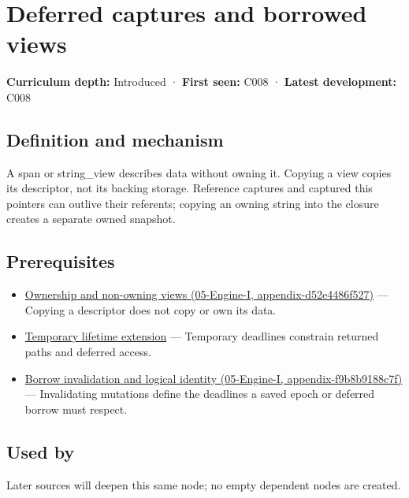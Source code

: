\hypertarget{appendix-aea529eb5175}{}
\section{Deferred captures and borrowed views}\label{appendix-aea529eb5175-deferred-captures-and-borrowed-views}

\textbf{Curriculum depth:} Introduced · \textbf{First seen:} C008 · \textbf{Latest development:} C008

\subsection{Definition and mechanism}\label{appendix-aea529eb5175-definition-and-mechanism}

A span or string\_view describes data without owning it. Copying a view copies its descriptor, not its backing storage. Reference captures and captured this pointers can outlive their referents; copying an owning string into the closure creates a separate owned snapshot.

\subsection{Prerequisites}\label{appendix-aea529eb5175-prerequisites}

\begin{itemize}
\tightlist
\item
  \href{../05-Engine-I/main.pdf\#nameddest=appendix-d52e4486f527}{Ownership and non-owning views (05-Engine-I, appendix-d52e4486f527)} --- Copying a descriptor does not copy or own its data.
\item
  \hyperref[appendix-a978b29bbbb0]{Temporary lifetime extension} --- Temporary deadlines constrain returned paths and deferred access.
\item
  \href{../05-Engine-I/main.pdf\#nameddest=appendix-f9b8b9188c7f}{Borrow invalidation and logical identity (05-Engine-I, appendix-f9b8b9188c7f)} --- Invalidating mutations define the deadlines a saved epoch or deferred borrow must respect.
\end{itemize}

\subsection{Used by}\label{appendix-aea529eb5175-used-by}

Later sources will deepen this same node; no empty dependent nodes are created.


